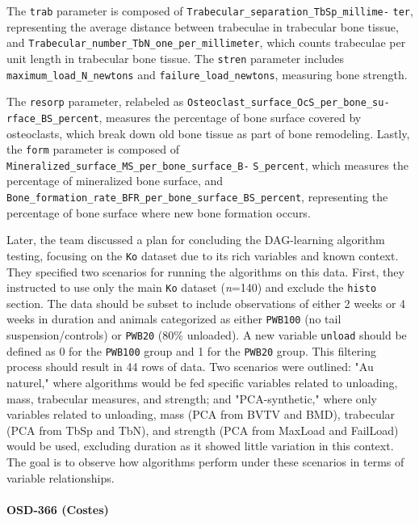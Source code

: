 \documentclass{article}
\begin{document}
The \texttt{trab} parameter is composed of \texttt{Trabecular\_separation\_TbSp\_millime-} \texttt{ter}, representing the average distance between trabeculae in trabecular bone tissue, and \texttt{Trabecular\_number\_TbN\_one\_per\_millimeter}, which counts trabeculae per unit length in trabecular bone tissue. The \texttt{stren} parameter includes \texttt{maximum\_load\_N\_newtons} and \texttt{failure\_load\_newtons}, measuring bone strength.

The \texttt{resorp} parameter, relabeled as \texttt{Osteoclast\_surface\_OcS\_per\_bone\_su-} \texttt{rface\_BS\_percent}, measures the percentage of bone surface covered by osteoclasts, which break down old bone tissue as part of bone remodeling. Lastly, the \texttt{form} parameter is composed of \texttt{Mineralized\_surface\_MS\_per\_bone\_surface\_B-} \texttt{S\_percent}, which measures the percentage of mineralized bone surface, and \texttt{Bone\_formation\_rate\_BFR\_per\_bone\_surface\_BS\_percent}, representing the percentage of bone surface where new bone formation occurs.

Later, the team discussed a plan for concluding the DAG-learning algorithm testing, focusing on the \texttt{Ko} dataset due to its rich variables and known context. They specified two scenarios for running the algorithms on this data. First, they instructed to use only the main \texttt{Ko} dataset (\textit{n}=140) and exclude the \texttt{histo} section. The data should be subset to include observations of either 2 weeks or 4 weeks in duration and animals categorized as either \texttt{PWB100} (no tail suspension/controls) or \texttt{PWB20} (80\% unloaded). A new variable \texttt{unload} should be defined as 0 for the \texttt{PWB100} group and 1 for the \texttt{PWB20} group. This filtering process should result in 44 rows of data. Two scenarios were outlined: "Au naturel," where algorithms would be fed specific variables related to unloading, mass, trabecular measures, and strength; and "PCA-synthetic," where only variables related to unloading, mass (PCA from BVTV and BMD), trabecular (PCA from TbSp and TbN), and strength (PCA from MaxLoad and FailLoad) would be used, excluding duration as it showed little variation in this context. The goal is to observe how algorithms perform under these scenarios in terms of variable relationships.

\paragraph{OSD-366 (Costes)}
\end{document}
